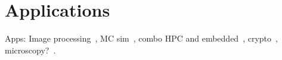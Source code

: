 \section{Applications}
\label{sec:apps}

Apps: Image processing~\cite{dbd+13}, MC sim~\cite{shsc08,tttl10},
combo HPC and embedded~\cite{rpm+15}, crypto~\cite{dfg+13},
microscopy?~\cite{tzwz15}.

